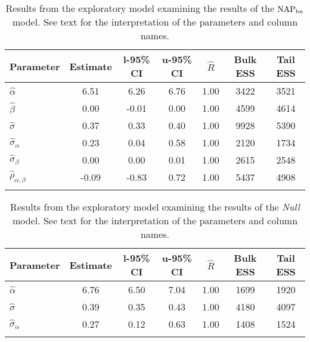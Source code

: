 \begin{table}

\caption{Results from the exploratory model examining the results of the $\operatorname{NAP}_{\text{bu}}$ model. See text for the interpretation of the parameters and column names.\label{tab:the exploratory-NAPbu}}

\begin{tabular}{l *3{S[table-format=-1.2]} S[table-format=1.2] *2{S[table-format=5.0]}}
\lsptoprule
Parameter & {Estimate} & {l-95\% CI} & {u-95\% CI} & {$\hat{R}$} & {Bulk ESS} & {Tail ESS}\\
\midrule
$\hat\alpha$ & 6.51 & 6.26 & 6.76 & 1.00 & 3422 & 3521\\
$\hat\beta$ & 0.00 & -0.01 & 0.00 & 1.00 & 4599 & 4614\\
$\hat\sigma$ & 0.37 & 0.33 & 0.40 & 1.00 & 9928 & 5390\\
$\hat\sigma_{\alpha}$ & 0.23 & 0.04 & 0.58 & 1.00 & 2120 & 1734\\
$\hat\sigma_{\beta}$ & 0.00 & 0.00 & 0.01 & 1.00 & 2615 & 2548\\
$\hat\rho_{\alpha,\beta}$ & -0.09 & -0.83 & 0.72 & 1.00 & 5437 & 4908\\
\lspbottomrule
\end{tabular}

\end{table}






\begin{table}

\caption{Results from the exploratory model examining the results of the \textit{Null} model. \label{tab:the exploratory-null}See text for the interpretation of the parameters and column names.}

\begin{tabular}{l *3{S[table-format=-1.2]} S[table-format=1.2] *2{S[table-format=5.0]}}
\lsptoprule
Parameter & {Estimate} & {l-95\% CI} & {u-95\% CI} & {$\hat{R}$} & {Bulk ESS} & {Tail ESS}\\
\midrule
$\hat\alpha$ & 6.76 & 6.50 & 7.04 & 1.00 & 1699 & 1920\\
$\hat\sigma$ & 0.39 & 0.35 & 0.43 & 1.00 & 4180 & 4097\\
$\hat\sigma_{\alpha}$ & 0.27 & 0.12 & 0.63 & 1.00 & 1408 & 1524\\
\lspbottomrule
\end{tabular}

\end{table}






